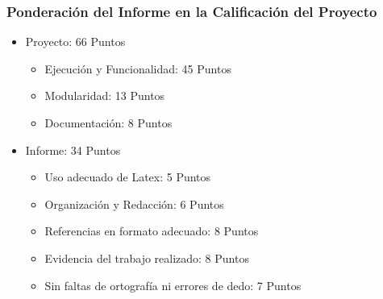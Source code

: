 \begin{frame}
\frametitle{Ponderación del Informe en la Calificación del Proyecto}
\begin{itemize}
\item Proyecto: 66 Puntos
\begin{itemize}
\item Ejecución y Funcionalidad: 45 Puntos
\item Modularidad: 13 Puntos
\item Documentación: 8 Puntos
\end{itemize}
\item Informe: 34 Puntos
\begin{itemize}
\item Uso adecuado de Latex: 5 Puntos
\item Organizaci\'on y Redacci\'on: 6 Puntos
\item Referencias en formato adecuado: 8 Puntos
\item Evidencia del trabajo realizado: 8 Puntos
\item Sin faltas de ortografía ni errores de dedo: 7 Puntos
\end{itemize}
\end{itemize}
\end{frame}

